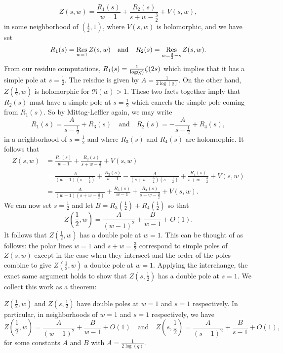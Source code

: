 \documentclass[12pt,reqno,oneside]{amsart}
\begin{document}
    \[
        Z(s,w) = \frac{R_{1}(s)}{w-1}+\frac{R_{2}(s)}{s+w-\frac{3}{2}}+V(s,w),
    \]
    in some neighborhood of $\left(\frac{1}{2},1\right)$, where $V(s,w)$ is holomorphic, and we have set
    \[
        R_{1}(s) = \operatorname*{\mathrm{Res}}_{w = 1}Z(s,w) \quad \text{and} \quad R_{2}(s) = \operatorname*{\mathrm{Res}}_{w = \frac{3}{2}-s}Z(s,w).
    \]
    From our residue computations, $R_{1}(s) = \frac{1}{\log(q)}\zeta(2s)$ which implies that it has a simple pole at $s = \frac{1}{2}$. The reisdue is given by $A = \frac{1}{2\log(q)}$. On the other hand, $Z\left(\frac{1}{2},w\right)$ is holomorphic for $\Re(w) > 1$. These two facts together imply that $R_{2}(s)$ must have a simple pole at $s = \frac{1}{2}$ which cancels the simple pole coming from $R_{1}(s)$. So by Mittag-Leffler again, we may write
    \[
        R_{1}(s) = \frac{A}{s-\frac{1}{2}}+R_{3}(s) \quad \text{and} \quad R_{2}(s) = -\frac{A}{s-\frac{1}{2}}+R_{4}(s),
    \]
    in a neighborhood of $s = \frac{1}{2}$ and where $R_{3}(s)$ and $R_{4}(s)$ are holomorphic. It follows that
    \begin{align*}
        Z(s,w) &= \frac{R_{1}(s)}{w-1}+\frac{R_{2}(s)}{s+w-\frac{3}{2}}+V(s,w) \\ 
        &= \frac{A}{(w-1)\left(s-\frac{1}{2}\right)}+\frac{R_{3}(s)}{w-1}-\frac{A}{\left(s+w-\frac{3}{2}\right)\left(s-\frac{1}{2}\right)}+\frac{R_{4}(s)}{s+w-\frac{3}{2}}+V(s,w) \\
        &= \frac{A}{(w-1)\left(s+w-\frac{3}{2}\right)}+\frac{R_{3}(s)}{w-1}+\frac{R_{4}(s)}{s+w-\frac{3}{2}}+V(s,w).
    \end{align*}
    We can now set $s = \frac{1}{2}$ and let $B = R_{3}\left(\frac{1}{2}\right)+R_{4}\left(\frac{1}{2}\right)$ so that
    \[
        Z\left(\frac{1}{2},w\right) = \frac{A}{(w-1)^{2}}+\frac{B}{w-1}+O(1).
    \]
    It follows that $Z\left(\frac{1}{2},w\right)$ has a double pole at $w = 1$. This can be thought of as follows: the polar lines $w = 1$ and $s+w = \frac{3}{2}$ correspond to simple poles of $Z(s,w)$ except in the case when they intersect and the order of the poles combine to give $Z\left(\frac{1}{2},w\right)$ a double pole at $w = 1$. Applying the interchange, the exact same argument holds to show that $Z\left(s,\frac{1}{2}\right)$ has a double pole at $s = 1$. We collect this work as a theorem:

    \begin{theorem}\label{thm:double_poles_at_1/2}
        $Z\left(\frac{1}{2},w\right)$ and $Z\left(s,\frac{1}{2}\right)$ have double poles at $w = 1$ and $s = 1$ respectively. In particular, in neighborhoods of $w = 1$ and $s = 1$ respectively, we have
        \[
            Z\left(\frac{1}{2},w\right) = \frac{A}{(w-1)^{2}}+\frac{B}{w-1}+O(1) \quad \text{and} \quad Z\left(s,\frac{1}{2}\right) = \frac{A}{(s-1)^{2}}+\frac{B}{s-1}+O(1),
        \]
        for some constants $A$ and $B$ with $A = \frac{1}{2\log(q)}$. 
    \end{theorem}
\end{document}
